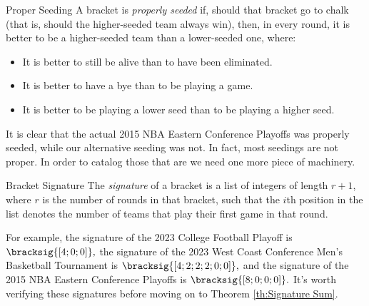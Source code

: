 {\begin{definition}{Proper Seeding}{}
    A bracket is \textit{properly seeded} if, should that bracket go to chalk (that is, should the higher-seeded team always win), then, in every round, it is better to be a higher-seeded team than a lower-seeded one, where: \begin{itemize}
        \item It is better to still be alive than to have been eliminated.
        \item It is better to have a bye than to be playing a game.
        \item It is better to be playing a lower seed than to be playing a higher seed.
    \end{itemize}
\end{definition}
It is clear that the actual 2015 NBA Eastern Conference Playoffs was properly seeded, while our alternative seeding was not. In fact, most seedings are not proper. In order to catalog those that are we need one more piece of machinery.
    
\begin{definition}{Bracket Signature}{}
    The \textit{signature} of a bracket is a list of integers of length $r + 1$, where $r$ is the number of rounds in that bracket, such that the $i$th position in the list denotes the number of teams that play their first game in that round.
\end{definition}

For example, the signature of the 2023 College Football Playoff is $\bracksig{[4; 0; 0]},$ the signature of the 2023 West Coast Conference Men's Basketball Tournament is $\bracksig{[4;2;2;2;0;0]},$ and the signature of the 2015 NBA Eastern Conference Playoffs is $\bracksig{[8; 0; 0; 0]}
.$ It's worth verifying these signatures before moving on to Theorem \ref{th:Signature Sum}.

}
